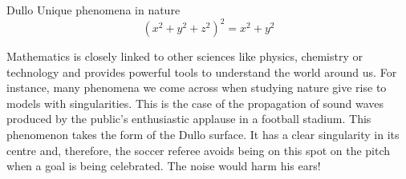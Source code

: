 \begin{surferPage}{Dullo}
Unique phenomena in nature\\
\smallskip
\[(x^2+ y^2+ z^2)^2	= x^2+ y^2\]

\singlespacing
Mathematics is closely linked to other sciences like physics, chemistry or technology and provides powerful tools to understand the world around us. 
\singlespacing
For instance, many phenomena we come across when studying nature give rise to models with singularities.
\singlespacing
This is the case of the propagation of sound waves produced by the public's enthusiastic applause in a football stadium. This phenomenon takes the form of the Dullo surface. It has a clear singularity in its centre and, therefore, the soccer referee avoids being on this spot on the pitch when a goal is being celebrated. The noise would harm his ears!
\end{surferPage}
